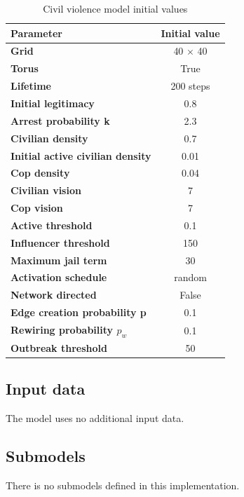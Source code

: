 \documentclass[10pt]{article}
\begin{document}
    \begin{table}[h]
        \centering
        \begin{tabular}{||>{\bfseries}l c ||}
            \hline
            Parameter & Initial value \\
            \hline
            \hline
            Grid & 40 $\times$ 40 \\
            Torus & True \\
            Lifetime & 200 steps \\
            Initial legitimacy & 0.8 \\
            Arrest probability k & 2.3 \\
            Civilian density & 0.7 \\
            Initial active civilian density & 0.01 \\
            Cop density & 0.04 \\
            Civilian vision & 7 \\
            Cop vision & 7 \\
            Active threshold & 0.1 \\
            Influencer threshold & 150 \\
            Maximum jail term & 30 \\
            Activation schedule & random \\
            Network directed & False \\
            Edge creation probability p & 0.1 \\
            Rewiring probability $p_w$ & 0.1 \\
            Outbreak threshold & 50 \\
            \hline
        \end{tabular}
        \caption{Civil violence model initial values }
        \label{table:parameter_initialization}
    \end{table}

    \subsection{Input data}
    The model uses no additional input data.

    \subsection{Submodels}
    There is no submodels defined in this implementation.

    \newpage
\end{document}
